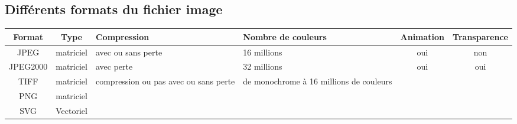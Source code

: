 \documentclass[10pt,fleqn]{article} %
\begin{document}
\subsection{Différents formats du fichier image}
\begin{tabular}{|c|c|p{3cm}|m{2.5cm}|c|c|}
	\hline
	\rowcolor{lightgray}Format&Type& Compression&Nombre de couleurs &Animation & Transparence\\
	\hline
	JPEG&matriciel &  avec ou sans perte & 16 millions&oui &non\\
	\hline
	JPEG2000&matriciel &avec perte &32 millions &oui &oui\\
	\hline
	TIFF&matriciel &compression ou pas avec ou sans perte & de monochrome à 16 millions de couleurs& & \\
	\hline
	PNG&matriciel & & & & \\
	\hline
	SVG&Vectoriel & & & & \\
	\hline
\end{tabular}\\
 
\end{document}
